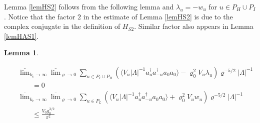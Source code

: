 \documentclass[11pt]{article}
\numberwithin{equation}{section}
\newcommand{\beqa}{\begin{eqnarray}}
\newcommand{\eeqa}{\end{eqnarray}}
\renewcommand\rho\varrho
\newtheorem{lem}{Lemma}[section]
\theoremstyle{definition}
\begin{document}
Lemma \ref{lemHS2} follows from the following lemma and $\lambda_u=-w_u$ for $u\in P_H\cup P_I$.
Notice that the factor $2$ in the estimate of Lemma \ref{lemHS2} is due to the complex conjugate in the definition of 
$H_{S2}$. Similar factor also appears in Lemma \ref{lemHAS1}. 
\begin{lem}\label{symno20}
\par %
\beqa\nonumber
&&\overline\lim_{k_c\to\infty}\overline\lim_{\rho\to0}\sum_{u\in P_I\cup P_H}\left(\langle V_u|\Lambda|^{-1}a^\dagger_ua^\dagger_{-u}a_0a_0\rangle- \rho_0^{2}V_u  \lambda_u\right)\rho^{-5/2}|\Lambda|^{-1}\\\label{u-uPMH}
&&\qquad=0
\\\nonumber
&&\overline\lim_{k_c\to\infty}\overline\lim_{\rho\to0}\sum_{u\in P_L}\left(\langle V_u|\Lambda|^{-1}a^\dagger_ua^\dagger_{-u}a_0a_0\rangle+\rho_0^2V_uw_u\right)\rho^{-5/2}|\Lambda|^{-1}\\\label{u-uPL}
&&\qquad\leq \frac{V_0g_0^{3/2}}{\pi^2}
\eeqa
\end{lem}
\end{document}
